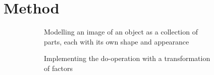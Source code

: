 \chapter{Method}

	\begin{figure}[t]
		\begin{subfigure}{0.49\linewidth}
			\centering
			
			\caption{Modelling an image of an object as a collection of parts, each with its own shape and appearance}
			\label{fig:s1}
		\end{subfigure}
		\begin{subfigure}{0.49\linewidth}
			\centering
			
			\caption{Implementing the do-operation with a transformation of factors}
			\label{fig:s2}
		\end{subfigure}
		\caption{}
		\label{fig:representation}
	\end{figure}

